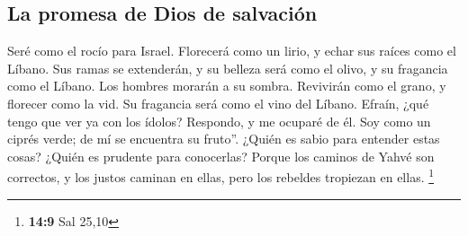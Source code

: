 \hypertarget{la-promesa-de-dios-de-salvaciuxf3n}{%
\subsection{La promesa de Dios de
salvación}\label{la-promesa-de-dios-de-salvaciuxf3n}}

 Seré como el rocío para Israel. Florecerá como un lirio,
y echar sus raíces como el Líbano.  Sus ramas se
extenderán, y su belleza será como el olivo, y su fragancia como el
Líbano.  Los hombres morarán a su sombra. Revivirán como
el grano, y florecer como la vid. Su fragancia será como el vino del
Líbano.  Efraín, ¿qué tengo que ver ya con los ídolos?
Respondo, y me ocuparé de él. Soy como un ciprés verde; de mí se
encuentra su fruto''.  ¿Quién es sabio para entender estas
cosas? ¿Quién es prudente para conocerlas? Porque los caminos de Yahvé
son correctos, y los justos caminan en ellas, pero los rebeldes
tropiezan en ellas. \footnote{\textbf{14:9} Sal 25,10}
